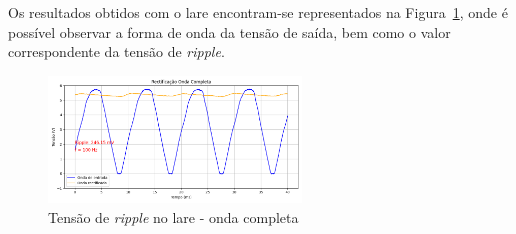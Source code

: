 Os resultados obtidos com o \acrshort{lare} encontram-se representados na Figura~\ref{fig:ripplelareonda}, onde é possível observar a forma de onda da tensão de saída, bem como o valor correspondente da tensão de \textit{ripple}. 

\begin{figure}[hbtp]
	\centering
	\includegraphics[width=0.6\textwidth]{figures/onda-completa.png}
	\caption{Tensão de \textit{ripple} no \acrshort{lare} - onda completa}
	\label{fig:ripplelareonda}
\end{figure}

